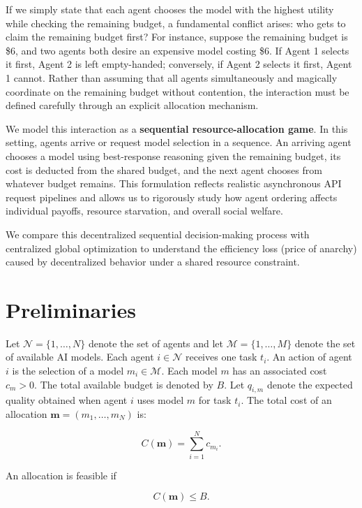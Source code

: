 \documentclass{article}
\begin{document}
If we simply state that each agent chooses the model with the highest utility while checking the remaining budget, a fundamental conflict arises: who gets to claim the remaining budget first? For instance, suppose the remaining budget is \$6, and two agents both desire an expensive model costing \$6. If Agent 1 selects it first, Agent 2 is left empty-handed; conversely, if Agent 2 selects it first, Agent 1 cannot. Rather than assuming that all agents simultaneously and magically coordinate on the remaining budget without contention, the interaction must be defined carefully through an explicit allocation mechanism. 

We model this interaction as a \textbf{sequential resource-allocation game}. In this setting, agents arrive or request model selection in a sequence. An arriving agent chooses a model using best-response reasoning given the remaining budget, its cost is deducted from the shared budget, and the next agent chooses from whatever budget remains. This formulation reflects realistic asynchronous API request pipelines and allows us to rigorously study how agent ordering affects individual payoffs, resource starvation, and overall social welfare. 

We compare this decentralized sequential decision-making process with centralized global optimization to understand the efficiency loss (price of anarchy) caused by decentralized behavior under a shared resource constraint. 

\section{Preliminaries} 

Let $\mathcal{N}=\{1,\ldots,N\}$ denote the set of agents and let $\mathcal{M}=\{1,\ldots,M\}$ denote the set of available AI models. Each agent $i\in\mathcal{N}$ receives one task $t_i$. An action of agent $i$ is the selection of a model $m_i\in\mathcal{M}$. Each model $m$ has an associated cost $c_m>0$. The total available budget is denoted by $B$. Let $q_{i,m}$ denote the expected quality obtained when agent $i$ uses model $m$ for task $t_i$. The total cost of an allocation $\mathbf{m}=(m_1,\ldots,m_N)$ is:

\begin{equation} 
C(\mathbf{m}) = \sum_{i=1}^{N} c_{m_i}. 
\end{equation} 

An allocation is feasible if 

\begin{equation} 
C(\mathbf{m}) \leq B. 
\end{equation} 
\end{document}
